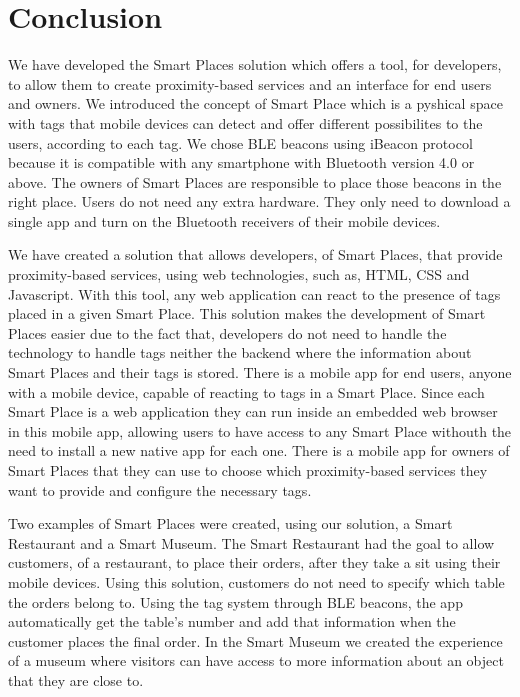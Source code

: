 
\section{Conclusion}
\label{sec:conclusion}
We have developed the Smart Places solution which offers a tool, for developers, to allow them to create proximity-based services and an interface for end users and owners.
We introduced the concept of Smart Place which is a pyshical space with tags that mobile devices can detect and offer different possibilites to the users, according to each tag.
We chose \gls{BLE} beacons using iBeacon protocol because it is compatible with any smartphone with Bluetooth version 4.0 or above.
The owners of Smart Places are responsible to place those beacons in the right place.
Users do not need any extra hardware.
They only need to download a single app and turn on the Bluetooth receivers of their mobile devices.

We have created a solution that allows developers, of Smart Places, that provide proximity-based services, using web technologies, such as, \gls{HTML}, \gls{CSS} and Javascript.
With this tool, any web application can react to the presence of tags placed in a given Smart Place.
This solution makes the development of Smart Places easier due to the fact that, developers do not need to handle the technology to handle tags neither the backend where the information about Smart Places and their tags is stored.
There is a mobile app for end users, anyone with a mobile device, capable of reacting to tags in a Smart Place.
Since each Smart Place is a web application they can run inside an embedded web browser in this mobile app, allowing users to have access to any Smart Place withouth the need to install a new native app for each one.
There is a mobile app for owners of Smart Places that they can use to choose which proximity-based services they want to provide and configure the necessary tags.

Two examples of Smart Places were created, using our solution, a Smart Restaurant and a Smart Museum.
The Smart Restaurant had the goal to allow customers, of a restaurant, to place their orders, after they take a sit using their mobile devices.
Using this solution, customers do not need to specify which table the orders belong to. Using the tag system through \gls{BLE} beacons, the app automatically get the table's number and add that information when the customer places the final order.
In the Smart Museum we created the experience of a museum where visitors can have access to more information about an object that they are close to.

